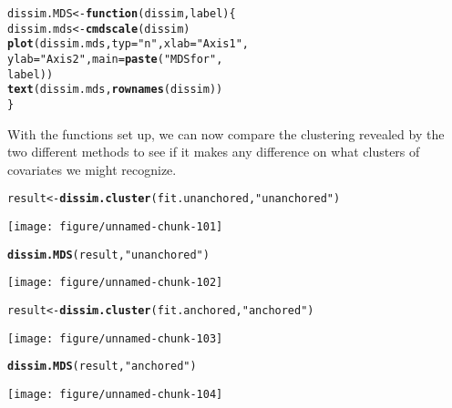 \documentclass[12pt]{article}\usepackage[]{graphicx}\usepackage[]{color}
\makeatletter
\def\maxwidth{ %
  \ifdim\Gin@nat@width>\linewidth
    \linewidth
  \else
    \Gin@nat@width
  \fi
}
\newcommand{\hlstr}[1]{\textcolor[rgb]{0.192,0.494,0.8}{#1}}%
\newcommand{\hlstd}[1]{\textcolor[rgb]{0.345,0.345,0.345}{#1}}%
\newcommand{\hlkwa}[1]{\textcolor[rgb]{0.161,0.373,0.58}{\textbf{#1}}}%
\newcommand{\hlkwb}[1]{\textcolor[rgb]{0.69,0.353,0.396}{#1}}%
\newcommand{\hlkwc}[1]{\textcolor[rgb]{0.333,0.667,0.333}{#1}}%
\newcommand{\hlkwd}[1]{\textcolor[rgb]{0.737,0.353,0.396}{\textbf{#1}}}%
\newenvironment{kframe}{%
 \def\at@end@of@kframe{}%
 \ifinner\ifhmode%
  \def\at@end@of@kframe{\end{minipage}}%
  \begin{minipage}{\columnwidth}%
 \fi\fi%
 \def\FrameCommand##1{\hskip\@totalleftmargin \hskip-\fboxsep
 \colorbox{shadecolor}{##1}\hskip-\fboxsep
     \hskip-\linewidth \hskip-\@totalleftmargin \hskip\columnwidth}%
 \MakeFramed {\advance\hsize-\width
   \@totalleftmargin\z@ \linewidth\hsize
   \@setminipage}}%
 {\par\unskip\endMakeFramed%
 \at@end@of@kframe}
\newenvironment{knitrout}{}{} %
\makeatother
\begin{document}
\begin{knitrout}
\color{fgcolor}\begin{kframe}
\begin{alltt}
\hlstd{dissim.MDS} \hlkwb{<-} \hlkwa{function}\hlstd{(}\hlkwc{dissim}\hlstd{,} \hlkwc{label}\hlstd{) \{}
  \hlstd{dissim.mds} \hlkwb{<-} \hlkwd{cmdscale}\hlstd{(dissim)}
  \hlkwd{plot}\hlstd{(dissim.mds,} \hlkwc{typ} \hlstd{=} \hlstr{"n"}\hlstd{,} \hlkwc{xlab} \hlstd{=} \hlstr{"Axis 1"}\hlstd{,}
    \hlkwc{ylab} \hlstd{=} \hlstr{"Axis 2"}\hlstd{,} \hlkwc{main} \hlstd{=} \hlkwd{paste}\hlstd{(}\hlstr{"MDS for "}\hlstd{,}
      \hlstd{label))}
  \hlkwd{text}\hlstd{(dissim.mds,} \hlkwd{rownames}\hlstd{(dissim))}
\hlstd{\}}
\end{alltt}
\end{kframe}
\end{knitrout}

With the functions set up, we can now compare the clustering revealed
by the two different methods to see if it makes any difference on what
clusters of covariates we might recognize.

\begin{knitrout}
\color{fgcolor}\begin{kframe}
\begin{alltt}
\hlstd{result} \hlkwb{<-} \hlkwd{dissim.cluster}\hlstd{(fit.unanchored,} \hlstr{"unanchored"}\hlstd{)}
\end{alltt}
\end{kframe}
\texttt{[image: figure/unnamed-chunk-101]}
\begin{kframe}\begin{alltt}
\hlkwd{dissim.MDS}\hlstd{(result,} \hlstr{"unanchored"}\hlstd{)}
\end{alltt}
\end{kframe}
\texttt{[image: figure/unnamed-chunk-102]}
\begin{kframe}\begin{alltt}
\hlstd{result} \hlkwb{<-} \hlkwd{dissim.cluster}\hlstd{(fit.anchored,} \hlstr{"anchored"}\hlstd{)}
\end{alltt}
\end{kframe}
\texttt{[image: figure/unnamed-chunk-103]}
\begin{kframe}\begin{alltt}
\hlkwd{dissim.MDS}\hlstd{(result,} \hlstr{"anchored"}\hlstd{)}
\end{alltt}
\end{kframe}
\texttt{[image: figure/unnamed-chunk-104]}

\end{knitrout}
\end{document}
